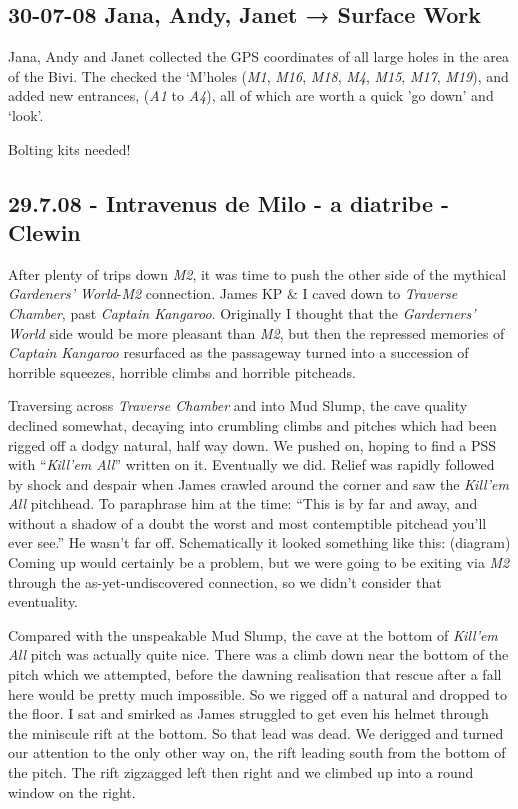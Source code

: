 
\hypertarget{jana-andy-janet-surface-work}{%
\subsection{30-07-08 Jana, Andy, Janet → Surface
Work}\label{jana-andy-janet-surface-work}}

Jana, Andy and Janet collected the GPS coordinates of all large holes in
the area of the Bivi. The checked the `M'holes (\emph{M1}, \emph{M16},
\emph{M18}, \emph{M4}, \emph{M15}, \emph{M17}, \emph{M19}), and added
new entrances, (\emph{A1} to \emph{A4}), all of which are worth a quick
'go down' and `look'.

Bolting kits needed! 

\hypertarget{intravenus-de-milo---a-diatribe---clewin}{%
\subsection{29.7.08 - Intravenus de Milo - a diatribe -
Clewin}\label{intravenus-de-milo---a-diatribe---clewin}}

After plenty of trips down \emph{M2}, it was time to push the other side
of the mythical \emph{Gardeners' World}-\emph{M2} connection. James KP
\& I caved down to \emph{Traverse Chamber}, past \emph{Captain
Kangaroo}. Originally I thought that the \emph{Garderners' World} side
would be more pleasant than \emph{M2}, but then the repressed memories
of \emph{Captain Kangaroo} resurfaced as the passageway turned into a
succession of horrible squeezes, horrible climbs and horrible pitcheads.

Traversing across \emph{Traverse Chamber} and into Mud Slump, the cave
quality declined somewhat, decaying into crumbling climbs and pitches
which had been rigged off a dodgy natural, half way down. We pushed on,
hoping to find a PSS with ``\emph{Kill'em All}'' written on it.
Eventually we did. Relief was rapidly followed by shock and despair when
James crawled around the corner and saw the \emph{Kill'em All}
pitchhead. To paraphrase him at the time: ``This is by far and away, and
without a shadow of a doubt the worst and most contemptible pitchead
you'll ever see.'' He wasn't far off. Schematically it looked something
like this: (diagram) Coming up would certainly be a problem, but we were
going to be exiting via \emph{M2} through the as-yet-undiscovered
connection, so we didn't consider that eventuality.

Compared with the unspeakable Mud Slump, the cave at the bottom of
\emph{Kill'em All} pitch was actually quite nice. There was a climb down
near the bottom of the pitch which we attempted, before the dawning
realisation that rescue after a fall here would be pretty much
impossible. So we rigged off a natural and dropped to the floor. I sat
and smirked as James struggled to get even his helmet through the
miniscule rift at the bottom. So that lead was dead. We derigged and
turned our attention to the only other way on, the rift leading south
from the bottom of the pitch. The rift zigzagged left then right and we
climbed up into a round window on the right.

